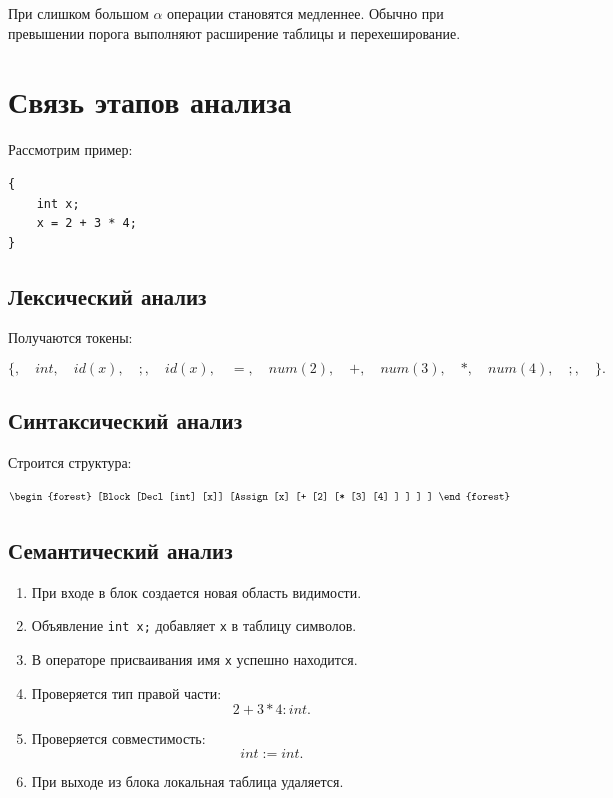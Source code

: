\documentclass[12pt,a4paper]{article}
\begin{document}
При слишком большом $\alpha$ операции становятся медленнее. Обычно при превышении порога выполняют расширение таблицы и перехеширование.

\section{Связь этапов анализа}

Рассмотрим пример:

\begin{lstlisting}
{
    int x;
    x = 2 + 3 * 4;
}
\end{lstlisting}

\subsection{Лексический анализ}

Получаются токены:

\[
\{,\quad int,\quad id(x),\quad ;,\quad id(x),\quad =,\quad num(2),\quad +,\quad num(3),\quad *,\quad num(4),\quad ;,\quad \}.
\]

\subsection{Синтаксический анализ}

Строится структура:

\[
\begin{forest}
[Block
  [Decl [int] [x]]
  [Assign
    [x]
    [+
      [2]
      [*
        [3]
        [4]
      ]
    ]
  ]
]
\end{forest}
\]

\subsection{Семантический анализ}

\begin{enumerate}
    \item При входе в блок создается новая область видимости.
    \item Объявление \texttt{int x;} добавляет \texttt{x} в таблицу символов.
    \item В операторе присваивания имя \texttt{x} успешно находится.
    \item Проверяется тип правой части:
    \[
    2+3*4 : int.
    \]
    \item Проверяется совместимость:
    \[
    int := int.
    \]
    \item При выходе из блока локальная таблица удаляется.
\end{enumerate}
\end{document}
